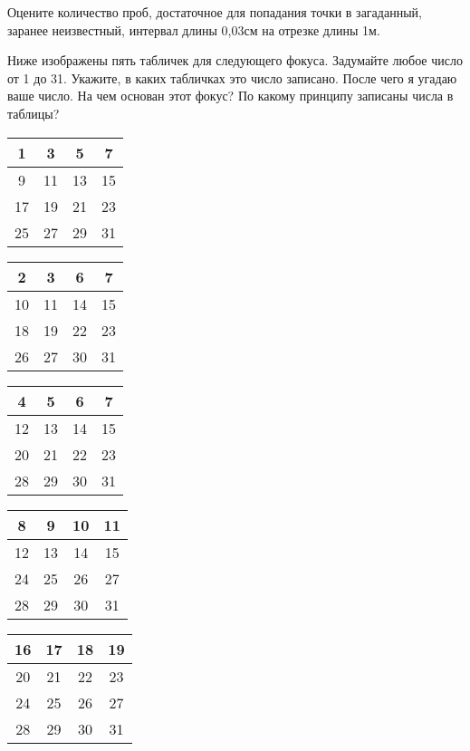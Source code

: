 \begin{thm}
    Оцените количество проб, достаточное для попадания точки в загаданный, заранее неизвестный, интервал длины 0,03см на отрезке длины 1м.
\end{thm}

\begin{thm}
    Ниже изображены пять табличек для следующего фокуса. Задумайте любое число от 1 до 31. Укажите, в каких табличках это число записано. После чего я угадаю ваше число. На чем основан этот фокус? По какому принципу записаны числа в таблицы?
\end{thm}

\begin{tabular}{ |c|c|c|c| } 
\hline
1 & 3 & 5 & 7 \\ 
\hline
9 & 11 & 13 & 15 \\ 
\hline
17 & 19 & 21 & 23 \\ 
\hline
25 & 27 & 29 & 31 \\ 
\hline
\end{tabular}
\hfill
\begin{tabular}{ |c|c|c|c| } 
\hline
2 & 3 & 6 & 7 \\ 
\hline
10 & 11 & 14 & 15 \\ 
\hline
18 & 19 & 22 & 23 \\ 
\hline
26 & 27 & 30 & 31 \\ 
\hline
\end{tabular}
\hfill
\begin{tabular}{ |c|c|c|c| } 
\hline
4 & 5 & 6 & 7 \\ 
\hline
12 & 13 & 14 & 15 \\ 
\hline
20 & 21 & 22 & 23 \\ 
\hline
28 & 29 & 30 & 31 \\ 
\hline
\end{tabular}
\hfill
\begin{tabular}{ |c|c|c|c| } 
\hline
8 & 9 & 10 & 11 \\ 
\hline
12 & 13 & 14 & 15 \\ 
\hline
24 & 25 & 26 & 27 \\ 
\hline
28 & 29 & 30 & 31 \\ 
\hline
\end{tabular}
\hfill
\begin{tabular}{ |c|c|c|c| } 
\hline
16 & 17 & 18 & 19 \\ 
\hline
20 & 21 & 22 & 23 \\ 
\hline
24 & 25 & 26 & 27 \\ 
\hline
28 & 29 & 30 & 31 \\ 
\hline
\end{tabular}